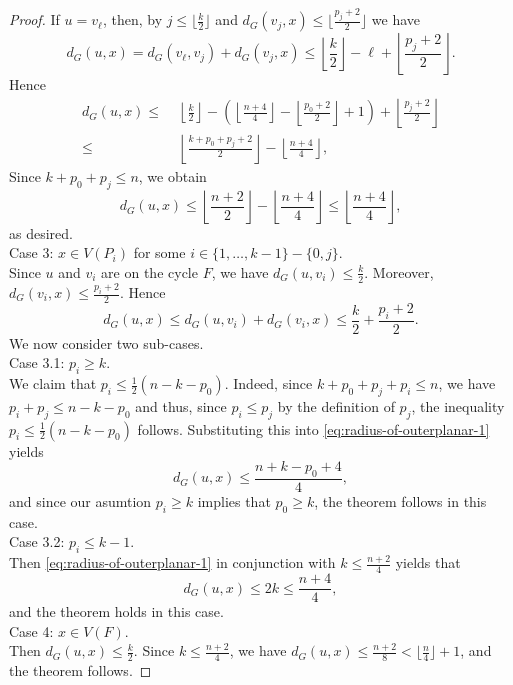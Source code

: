 \documentclass[a4paper,11pt]{article}
\numberwithin{equation}{theorem}
\begin{document}
\begin{proof}
If $u = v_{\ell}$, then, by $j \leq \lfloor \frac{k}{2}\rfloor$ and 
$d_G(v_j,x) \leq  \lfloor \frac{p_j+2}{2} \rfloor$ we have    
\[  d_G(u,x)  =  d_G(v_{\ell},v_j) + d_G(v_j,x) 
      \leq   \left\lfloor \frac{k}{2} \right\rfloor -\ell + \left\lfloor \frac{p_j+2}{2} \right\rfloor. \]
Hence
\begin{align*}
 d_G(u,x) \leq&\;  \left\lfloor \frac{k}{2} \right\rfloor -\left(\left\lfloor \frac{n+4}{4} \right\rfloor - \left\lfloor \frac{p_0+2}{2} \right\rfloor+ 1 \right)+ \left\lfloor \frac{p_j+2}{2} \right \rfloor\\
 \leq& \; \left\lfloor \frac{k+p_0 + p_j+2}{2} \right\rfloor  - \left\lfloor \frac{n+4}{4} \right\rfloor,
\end{align*}
Since $k+p_0+p_j \leq n$, we obtain
\[ d_G(u,x) \leq \left\lfloor \frac{n+2}{2} \right\rfloor - \left\lfloor \frac{n+4}{4} \right\rfloor
            \leq \left\lfloor \frac{n+4}{4} \right\rfloor, \]
as desired. \\[1mm]
{\sc Case 3:} $x \in V(P_i)$ for some $i \in \{1,\ldots,k-1\} - \{0,j\}$. \\
Since $u$ and $v_i$ are on the cycle $F$, we have $d_G(u,v_i) \leq \frac{k}{2}$. 
Moreover, $d_G(v_i,x) \leq \frac{p_i+2}{2}$. Hence 
\begin{equation} \label{eq:radius-of-outerplanar-1} 
d_G(u,x) \leq d_G(u,v_i) + d_G(v_i,x) \leq \frac{k}{2} +\frac{p_i+2}{2}. 
\end{equation}
We now consider two sub-cases. \\[1mm]
{\sc Case 3.1:} $p_i \geq k$. \\
We claim that $p_i \leq \frac{1}{2}(n-k-p_0)$. Indeed, since $k+p_0+p_j+p_i \leq n$,
we have $p_i + p_j \leq n-k-p_0$ and thus, since $p_i \leq p_j$ by the definition of $p_j$, 
the inequality $p_i \leq \frac{1}{2}(n-k-p_0)$ follows.
Substituting this into \eqref{eq:radius-of-outerplanar-1} yields 
\[ d_G(u,x) \leq \frac{n+k-p_0+4}{4}, \]
and since our asumtion $p_i \geq k$ implies that $p_0 \geq k$, the theorem follows in this case. \\[1mm]
{\sc Case 3.2:} $p_i \leq k-1$. \\
Then \eqref{eq:radius-of-outerplanar-1} in conjunction with $k \leq \frac{n+2}{4}$ yields that 
\[ d_G(u,x) \leq 2k \leq \frac{n+4}{4}, \]
and the theorem holds in this case. \\[1mm]
{\sc Case 4:} $x \in V(F)$. \\
Then $d_G(u,x) \leq \frac{k}{2}$. Since $k \leq \frac{n+2}{4}$, we have
$d_G(u,x) \leq \frac{n+2}{8} < \lfloor \frac{n}{4} \rfloor +1$, and the theorem follows.
\end{proof}
\end{document}
